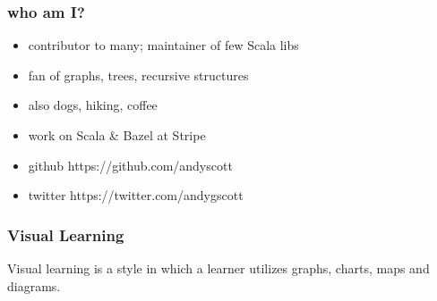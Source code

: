 \documentclass[include/preamble.tex]{subfiles}
\begin{document}
{
  \begin{frame}
    \frametitle{who am I?}
    \begin{itemize}
      \pause
    \item contributor to many; maintainer of few Scala libs
    \item fan of graphs, trees, recursive structures
    \item also dogs, hiking, coffee
    \item work on Scala \& Bazel at Stripe
      \newline
      \pause
    \item github https://github.com/andyscott
    \item twitter https://twitter.com/andygscott
    \end{itemize}
  \end{frame}

  \begin{frame}
    \frametitle{Visual Learning}
    \begin{displayquote}
      Visual learning is a style in which a learner
      utilizes graphs, charts, maps and diagrams.
    \end{displayquote}
  \end{frame}

}
\end{document}
